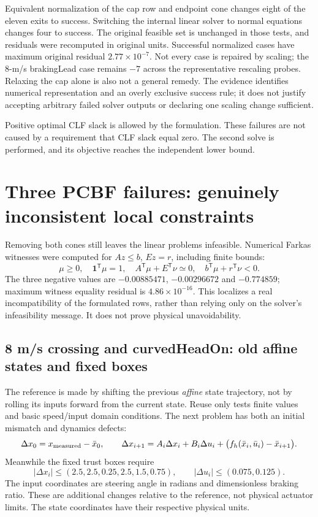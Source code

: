 \documentclass[11pt]{article}
\begin{document}
Equivalent normalization of the cap row and endpoint cone changes eight of
the eleven exits to success. Switching the internal linear solver to normal
equations changes four to success. The original feasible set is unchanged
in those tests, and residuals were recomputed in original units. Successful
normalized cases have maximum original residual $2.77\times10^{-7}$.
Not every case is repaired by scaling; the 8-m/s brakingLead case remains
$-7$ across the representative rescaling probes. Relaxing the cap alone is
also not a general remedy. The evidence identifies numerical representation
and an overly exclusive success rule; it does not justify accepting arbitrary
failed solver outputs or declaring one scaling change sufficient.

Positive optimal CLF slack is allowed by the formulation. These failures are
not caused by a requirement that CLF slack equal zero. The second solve is
performed, and its objective reaches the independent lower bound.

\section{Three PCBF failures: genuinely inconsistent local constraints}
Removing both cones still leaves the linear problems infeasible. Numerical
Farkas witnesses were computed for $Az\le b$, $Ez=r$, including finite bounds:
\[
 \mu\ge0,\quad\boldsymbol{1}^{\mathsf T}\mu=1,\quad
 A^{\mathsf T}\mu+E^{\mathsf T}\nu\simeq0,\quad
 b^{\mathsf T}\mu+r^{\mathsf T}\nu<0.
\]
The three negative values are $-0.00885471$, $-0.00296672$ and $-0.774859$;
maximum witness equality residual is $4.86\times10^{-16}$. This localizes a
real incompatibility of the formulated rows, rather than relying only on the
solver's infeasibility message. It does not prove physical unavoidability.

\subsection{8 m/s crossing and curvedHeadOn: old affine states and fixed boxes}
The reference is made by shifting the previous \emph{affine} state trajectory,
not by rolling its inputs forward from the current state. Reuse only tests
finite values and basic speed/input domain conditions. The next problem has
both an initial mismatch and dynamics defects:
\[
 \Delta x_0=x_{\rm measured}-\bar x_0,\qquad
 \Delta x_{i+1}=A_i\Delta x_i+B_i\Delta u_i+
 \bigl(f_h(\bar x_i,\bar u_i)-\bar x_{i+1}\bigr).
\]
Meanwhile the fixed trust boxes require
\[
 |\Delta x_i|\le(2.5,2.5,0.25,2.5,1.5,0.75),\qquad
 |\Delta u_i|\le(0.075,0.125).
\]
The input coordinates are steering angle in radians and dimensionless braking
ratio. These are additional changes relative to the reference, not physical
actuator limits. The state coordinates have their respective physical units.
\end{document}
